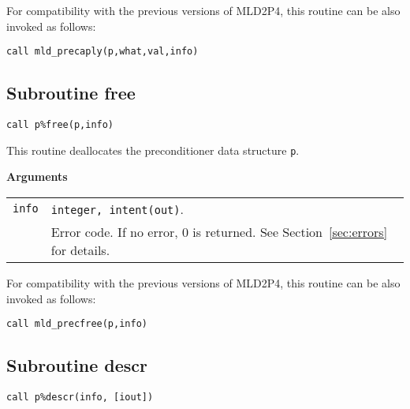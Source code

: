 \baselineskip
For compatibility with the previous versions of MLD2P4, this routine can be also invoked
as follows:

\begin{center}
\verb|call mld_precaply(p,what,val,info)|
\end{center}

\clearpage

\subsection{Subroutine free\label{sec:precfree}}

\begin{center}
\verb|call p%free(p,info)|\\
\end{center}

\noindent
This routine deallocates the preconditioner data structure \verb|p|.

{\baselineskip\noindent\large\bfseries Arguments} \smallskip

\begin{tabular}{p{1.2cm}p{10.5cm}}
\verb|info|   & \verb|integer, intent(out)|.\\
              & Error code. If no error, 0 is returned. See Section~\ref{sec:errors} for details.\\
\end{tabular}

\baselineskip
For compatibility with the previous versions of MLD2P4, this routine can be also invoked
as follows:

\begin{center}
\verb|call mld_precfree(p,info)|
\end{center}


\clearpage

\subsection{Subroutine descr\label{sec:precdescr}}

\begin{center}
\verb|call p%descr(info, [iout])|\\
\end{center}

